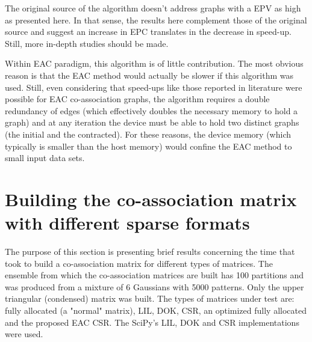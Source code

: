 The original source \cite{Sousa2015} of the algorithm doesn't address graphs with a EPV as high as presented here.
In that sense, the results here complement those of the original source and suggest an increase in EPC translates in the decrease in speed-up.
Still, more in-depth studies should be made.

Within EAC paradigm, this algorithm is of little contribution.
The most obvious reason is that the EAC method would actually be slower if this algorithm was used.
Still, even considering that speed-ups like those reported in literature were possible for EAC co-association graphs, the algorithm requires a double redundancy of edges (which effectively doubles the necessary memory to hold a graph) and at any iteration the device must be able to hold two distinct graphs (the initial and the contracted).
For these reasons, the device memory (which typically is smaller than the host memory) would confine the EAC method to small input data sets. 


%
%

\section{Building the co-association matrix with different sparse formats}
\label{sec:spare building}

The purpose of this section is presenting brief results concerning the time that took to build a co-association matrix for different types of matrices.
The ensemble from which the co-association matrices are built has 100 partitions and was produced from a mixture of 6 Gaussians with 5000 patterns.
Only the upper triangular (condensed) matrix was built.
The types of matrices under test are: fully allocated (a "normal" matrix), LIL, DOK, CSR, an optimized fully allocated and the proposed EAC CSR.
The SciPy's LIL, DOK and CSR implementations were used.

